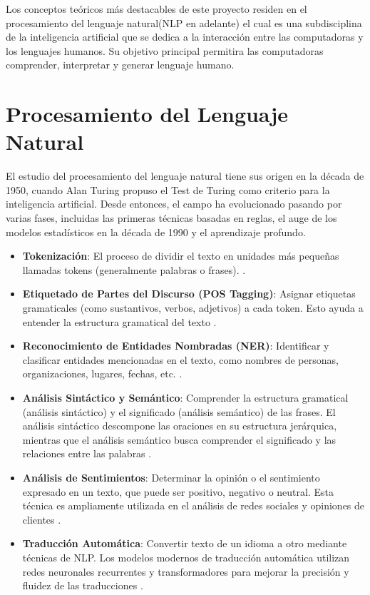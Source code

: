 
Los conceptos teóricos más destacables de este proyecto residen en el procesamiento del lenguaje natural(NLP en adelante) el cual es una subdisciplina de la inteligencia artificial que se dedica a la interacción entre las computadoras y los lenguajes humanos. Su objetivo principal permitira las computadoras comprender, interpretar y generar lenguaje humano.

\section{Procesamiento del Lenguaje Natural}\label{NLP}

El estudio del procesamiento del lenguaje natural tiene sus origen en la década de 1950, cuando Alan Turing propuso el Test de Turing como criterio para la inteligencia artificial. Desde entonces, el campo ha evolucionado pasando por varias fases, incluidas las primeras técnicas basadas en reglas, el auge de los modelos estadísticos en la década de 1990 y el aprendizaje profundo.

\begin{itemize}
    \item \textbf{Tokenización}: El proceso de dividir el texto en unidades más pequeñas llamadas tokens (generalmente palabras o frases).  \citep{jurafsky2020speech}.
    
    \item \textbf{Etiquetado de Partes del Discurso (POS Tagging)}: Asignar etiquetas gramaticales (como sustantivos, verbos, adjetivos) a cada token. Esto ayuda a entender la estructura gramatical del texto \citep{manning2014stanford}.
    
    \item \textbf{Reconocimiento de Entidades Nombradas (NER)}: Identificar y clasificar entidades mencionadas en el texto, como nombres de personas, organizaciones, lugares, fechas, etc. \citep{ratinov2009design}.
    
    \item \textbf{Análisis Sintáctico y Semántico}: Comprender la estructura gramatical (análisis sintáctico) y el significado (análisis semántico) de las frases. El análisis sintáctico descompone las oraciones en su estructura jerárquica, mientras que el análisis semántico busca comprender el significado y las relaciones entre las palabras \citep{jurafsky2020speech}.
    
    \item \textbf{Análisis de Sentimientos}: Determinar la opinión o el sentimiento expresado en un texto, que puede ser positivo, negativo o neutral. Esta técnica es ampliamente utilizada en el análisis de redes sociales y opiniones de clientes \citep{pang2008opinion}.
    
    \item \textbf{Traducción Automática}: Convertir texto de un idioma a otro mediante técnicas de NLP. Los modelos modernos de traducción automática utilizan redes neuronales recurrentes y transformadores para mejorar la precisión y fluidez de las traducciones \citep{bahdanau2015neural}.
\end{itemize}

